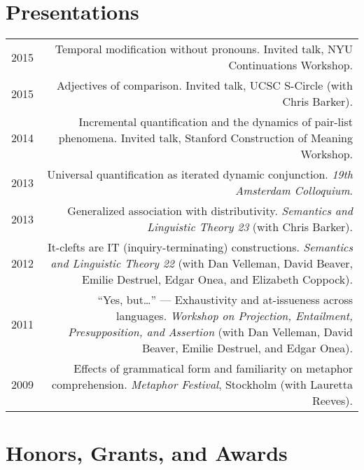 \documentclass[11pt]{article}
\begin{document}
\section*{Presentations}

\begin{longtable}{LR}
  2015 & Temporal modification without pronouns. Invited talk, NYU
         Continuations Workshop.\\
  2015 &  Adjectives of comparison. Invited talk, UCSC S-Circle (with Chris
          Barker).\\
  2014 &  Incremental quantification and the dynamics of pair-list phenomena.
          Invited talk, Stanford Construction of Meaning Workshop.\\
  2013 &  Universal quantification as iterated dynamic conjunction. \textit{19th
          Amsterdam Colloquium}.\\
  2013 &  Generalized association with distributivity. \textit{Semantics and
          Linguistic Theory 23} (with Chris Barker).\\
  2012 &  It-clefts are IT (inquiry-terminating) constructions.
          \textit{Semantics and Linguistic Theory 22} (with Dan Velleman,
          David Beaver, Emilie Destruel, Edgar Onea, and Elizabeth Coppock).\\
  2011 &  ``Yes, but\dots'' --- Exhaustivity and at-issueness across languages.
          \textit{Workshop on Projection, Entailment, Presupposition, and
          Assertion} (with Dan Velleman, David Beaver, Emilie Destruel, and
          Edgar Onea).\\
  2009 &  Effects of grammatical form and familiarity on metaphor
          comprehension. \textit{Metaphor Festival}, Stockholm (with Lauretta Reeves).
\end{longtable}


\section*{Honors, Grants, and Awards}
\end{document}
